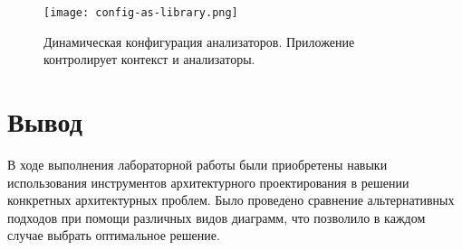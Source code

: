 \documentclass[listings]{labreport}
\begin{document}
\begin{figure}[H]
\centering
\texttt{[image: config-as-library.png]}
\caption{\small{Динамическая конфигурация анализаторов. Приложение контролирует контекст и анализаторы.}}
\label{fig:config-as-lib}
\end{figure}

\newpage
\section*{Вывод}

В ходе выполнения лабораторной работы были приобретены навыки использования
инструментов архитектурного проектирования в решении конкретных
архитектурных проблем. Было проведено сравнение альтернативных подходов
при помощи различных видов диаграмм, что позволило в каждом случае
выбрать оптимальное решение.
\end{document}
